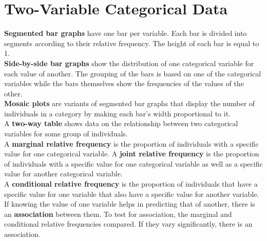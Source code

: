 \documentclass[../AP_Statistics.tex]{subfiles}
\begin{document}
	\chapter{Two-Variable Categorical Data}
		\textbf{Segmented bar graphs} have one bar per variable. Each bar is divided into segments according to their relative frequency. The height of each bar is equal to 1. \\
		\textbf{Side-by-side bar graphs} show the distribution of one categorical variable for each value of another. The grouping of the bars is based on one of the categorical variables while the bars themselves show the frequencies of the values of the other. \\
		\textbf{Mosaic plots} are variants of segmented bar graphs that display the number of individuals in a category by making each bar's width proportional to it. \\
		A \textbf{two-way table} shows data on the relationship between two categorical variables for some group of individuals. \\
		A \textbf{marginal relative frequency} is the proportion of individuals with a specific value for one categorical variable.
		A \textbf{joint relative frequency} is the proportion of individuals with a specific value for one categorical variable as well as a specific value for another categorical variable. \\
		A \textbf{conditional relative frequency} is the proportion of individuals that have a specific value for one variable that also have a specific value for another variable. \\
		If knowing the value of one variable helps in predicting that of another, there is an \textbf{association} between them. To test for association, the marginal and conditional relative frequencies compared. If they vary significantly, there is an association.
\end{document}
